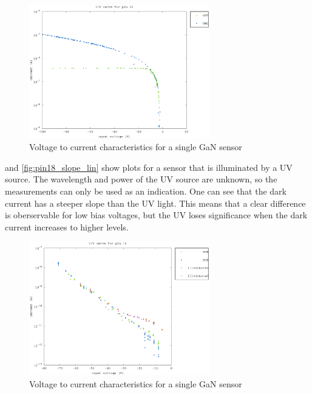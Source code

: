 \begin{figure}[h]
	    \centering
	    \includegraphics[width=0.7\textwidth]{fig/pin26_slope.eps}
	    \caption[]%
	    {Voltage to current characteristics for a single GaN sensor}    
	    \label{fig:pin26_slope}	
\end{figure}  

 and \cref{fig:pin18_slope_lin} show plots for a sensor that is illuminated by a UV source. The wavelength and power of the UV source are unknown, so the measurements can only be used as an indication. One can see that the dark current has a steeper slope than the UV light. This means that a clear difference is oberservable for low bias voltages, but the UV loses significance when the dark current increases to higher levels.

\begin{figure}[h]
	    \centering
        \includegraphics[width=0.7\textwidth]{fig/pin18_slope_UV.eps}
	    \caption[]%
	    {Voltage to current characteristics for a single GaN sensor}    
	    \label{fig:pin18_slope}	
\end{figure}  

